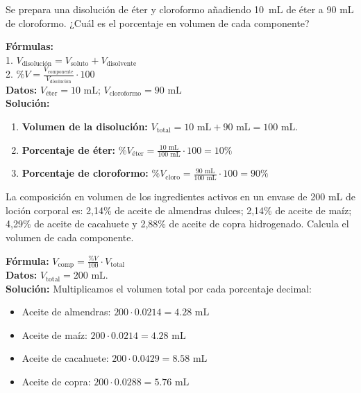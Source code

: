 \begin{exercise}
    Se prepara una disolución de éter y cloroformo añadiendo \qty{10}{\mL} de éter a 90 mL de cloroformo. ¿Cuál es el porcentaje en volumen de cada componente?
    \begin{solu}
        \textbf{Fórmulas:} \\
        1. $V_{\text{disolución}} = V_{\text{soluto}} + V_{\text{disolvente}}$ \\
        2. $\%V = \frac{V_{\text{componente}}}{V_{\text{disolución}}} \cdot 100$ \\

        \textbf{Datos:} $V_{\text{éter}} = 10 \text{ mL}$; $V_{\text{cloroformo}} = 90 \text{ mL}$ \\

        \textbf{Solución:}
        \begin{enumerate}
            \item \textbf{Volumen de la disolución:} $V_{\text{total}} = 10 \text{ mL} + 90 \text{ mL} = 100 \text{ mL}$.
            \item \textbf{Porcentaje de éter:} $\%V_{\text{éter}} = \frac{10 \text{ mL}}{100 \text{ mL}} \cdot 100 = 10\%$
            \item \textbf{Porcentaje de cloroformo:} $\%V_{\text{cloro}} = \frac{90 \text{ mL}}{100 \text{ mL}} \cdot 100 = 90\%$
        \end{enumerate}
    \end{solu}
\end{exercise}

\begin{exercise}
    La composición en volumen de los ingredientes activos en un envase de 200 mL de loción corporal es: 2,14\% de aceite de almendras dulces; 2,14\% de aceite de maíz; 4,29\% de aceite de cacahuete y 2,88\% de aceite de copra hidrogenado. Calcula el volumen de cada componente.
    \begin{solu}
        \textbf{Fórmula:} $V_{\text{comp}} = \frac{\%V}{100} \cdot V_{\text{total}}$ \\
        \textbf{Datos:} $V_{\text{total}} = 200 \text{ mL}$. \\
        \textbf{Solución:} Multiplicamos el volumen total por cada porcentaje decimal:
        \begin{itemize}
            \item Aceite de almendras: $200 \cdot 0.0214 = 4.28 \text{ mL}$
            \item Aceite de maíz: $200 \cdot 0.0214 = 4.28 \text{ mL}$
            \item Aceite de cacahuete: $200 \cdot 0.0429 = 8.58 \text{ mL}$
            \item Aceite de copra: $200 \cdot 0.0288 = 5.76 \text{ mL}$
        \end{itemize}
    \end{solu}
\end{exercise}



